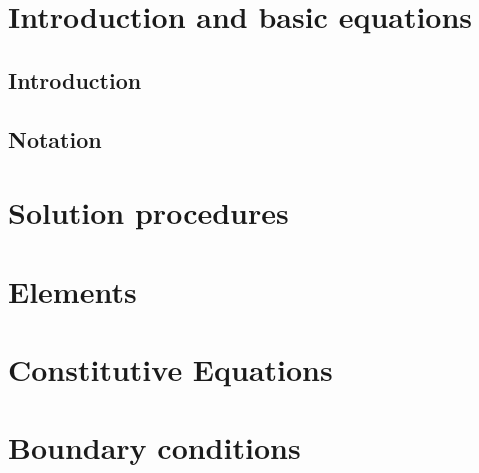 \documentclass[a4paper]{book}
\begin{document}


\clearpage
\setcounter{page}{1}
\pagestyle{headings}

\tableofcontents
%
\chapter{Introduction and basic equations}
\section{Introduction}
\section{Notation}

\chapter{Solution procedures}

\chapter{Elements}
\chapter{Constitutive Equations}
\chapter{Boundary conditions}

{}



\end{document}
